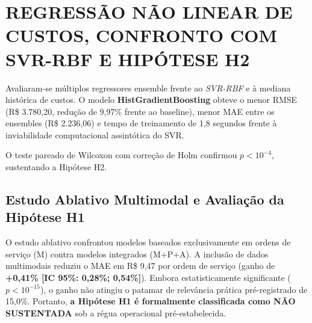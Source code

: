 \chapter{REGRESSÃO NÃO LINEAR DE CUSTOS, CONFRONTO COM SVR-RBF E HIPÓTESE H2}
\label{cap:regressao}

Avaliaram-se múltiplos regressores ensemble frente ao \textit{SVR-RBF} e à mediana histórica de custos. O modelo \textbf{HistGradientBoosting} obteve o menor RMSE (R\$ 3.780,20, redução de 9,97\% frente ao baseline), menor MAE entre os ensembles (R\$ 2.236,06) e tempo de treinamento de 1,8 segundos frente à inviabilidade computacional assintótica do SVR.

O teste pareado de Wilcoxon com correção de Holm confirmou $p < 10^{-4}$, sustentando a Hipótese H2.

\section{Estudo Ablativo Multimodal e Avaliação da Hipótese H1}

O estudo ablativo confrontou modelos baseados exclusivamente em ordens de serviço (M) contra modelos integrados (M+P+A). A inclusão de dados multimodais reduziu o MAE em R\$ 9,47 por ordem de serviço (ganho de \textbf{+0,41\% [IC 95\%: 0,28\%; 0,54\%]}). Embora estatisticamente significante ($p < 10^{-15}$), o ganho não atingiu o patamar de relevância prática pré-registrado de 15,0\%. Portanto, \textbf{a Hipótese H1 é formalmente classificada como NÃO SUSTENTADA} sob a régua operacional pré-estabelecida.
